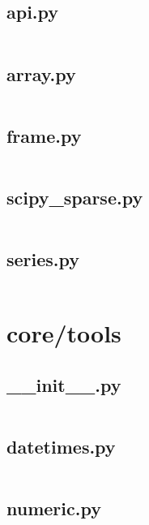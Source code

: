\documentclass{article}
\begin{document}
\subsection{api.py}
\inputminted{python}{/home/dufferzafar/dev/@clones/pandas/pandas/core/sparse/api.py}
\newpage

\subsection{array.py}
\inputminted{python}{/home/dufferzafar/dev/@clones/pandas/pandas/core/sparse/array.py}
\newpage

\subsection{frame.py}
\inputminted{python}{/home/dufferzafar/dev/@clones/pandas/pandas/core/sparse/frame.py}
\newpage

\subsection{scipy\_sparse.py}
\inputminted{python}{/home/dufferzafar/dev/@clones/pandas/pandas/core/sparse/scipy_sparse.py}
\newpage

\subsection{series.py}
\inputminted{python}{/home/dufferzafar/dev/@clones/pandas/pandas/core/sparse/series.py}
\newpage

\section{core/tools}

\subsection{\_\_init\_\_.py}
\inputminted{python}{/home/dufferzafar/dev/@clones/pandas/pandas/core/tools/__init__.py}
\newpage

\subsection{datetimes.py}
\inputminted{python}{/home/dufferzafar/dev/@clones/pandas/pandas/core/tools/datetimes.py}
\newpage

\subsection{numeric.py}
\inputminted{python}{/home/dufferzafar/dev/@clones/pandas/pandas/core/tools/numeric.py}
\newpage
\end{document}
